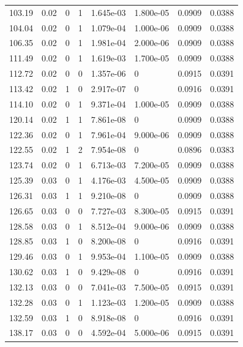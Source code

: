 \documentclass[preview]{standalone}
\begin{document}
{{{\begin{tabular}{L{1.2cm}C{1.2cm} C{0.3cm}C{0.5cm} C{1.4cm}C{1.4cm} C{1.4cm}C{1.4cm}}
  103.19  &  0.02  & 0     &  1 &  1.645e-03  & 1.800e-05  & 0.0909 &  0.0388   \\ 
  104.04  &  0.02  & 0     &  1 &  1.079e-04  & 1.000e-06  & 0.0909 &  0.0388   \\ 
  106.35  &  0.02  & 0     &  1 &  1.981e-04  & 2.000e-06  & 0.0909 &  0.0388   \\ 
  111.49  &  0.02  & 0     &  1 &  1.619e-03  & 1.700e-05  & 0.0909 &  0.0388   \\ 
  112.72  &  0.02  & 0     &  0 &  1.357e-06  & 0  & 0.0915 &  0.0391   \\ 
  113.42  &  0.02  & 1     &  0 &  2.917e-07  & 0  & 0.0916 &  0.0391   \\ 
  114.10  &  0.02  & 0     &  1 &  9.371e-04  & 1.000e-05  & 0.0909 &  0.0388   \\ 
  120.14  &  0.02  & 1     &  1 &  7.861e-08  & 0  & 0.0909 &  0.0388   \\ 
  122.36  &  0.02  & 0     &  1 &  7.961e-04  & 9.000e-06  & 0.0909 &  0.0388   \\ 
  122.55  &  0.02  & 1     &  2 &  7.954e-08  & 0  & 0.0896 &  0.0383   \\ 
  123.74  &  0.02  & 0     &  1 &  6.713e-03  & 7.200e-05  & 0.0909 &  0.0388   \\ 
  125.39  &  0.03  & 0     &  1 &  4.176e-03  & 4.500e-05  & 0.0909 &  0.0388   \\ 
  126.31  &  0.03  & 1     &  1 &  9.210e-08  & 0  & 0.0909 &  0.0388   \\ 
  126.65  &  0.03  & 0     &  0 &  7.727e-03  & 8.300e-05  & 0.0915 &  0.0391   \\ 
  128.58  &  0.03  & 0     &  1 &  8.512e-04  & 9.000e-06  & 0.0909 &  0.0388   \\ 
  128.85  &  0.03  & 1     &  0 &  8.200e-08  & 0  & 0.0916 &  0.0391   \\ 
  129.46  &  0.03  & 0     &  1 &  9.953e-04  & 1.100e-05  & 0.0909 &  0.0388   \\ 
  130.62  &  0.03  & 1     &  0 &  9.429e-08  & 0  & 0.0916 &  0.0391   \\ 
  132.13  &  0.03  & 0     &  0 &  7.041e-03  & 7.500e-05  & 0.0915 &  0.0391   \\ 
  132.28  &  0.03  & 0     &  1 &  1.123e-03  & 1.200e-05  & 0.0909 &  0.0388   \\ 
  132.59  &  0.03  & 1     &  0 &  8.918e-08  & 0  & 0.0916 &  0.0391   \\ 
  138.17  &  0.03  & 0     &  0 &  4.592e-04  & 5.000e-06  & 0.0915 &  0.0391   \\ 

\end{tabular}}}}
\end{document}
